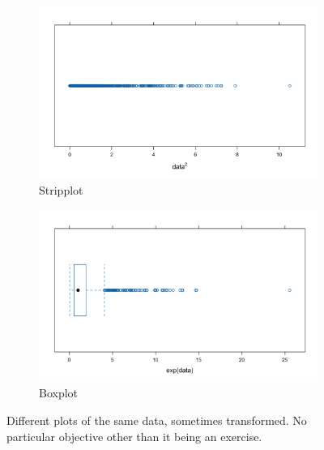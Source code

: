\documentclass[10pt, a4paper, titlepage]{article}
\begin{document}
\begin{figure}[H]
   
    \vspace{1cm}  
    \begin{subfigure}{0.4\textwidth}
        \includegraphics[width=\textwidth]{(c) Stripplot.png}
        \caption{Stripplot}
        \label{fig:stripplot}
    \end{subfigure}
    \hfill
    \begin{subfigure}{0.4\textwidth}
        \includegraphics[width=\textwidth]{(d) Boxplot.png}
        \caption{Boxplot}
        \label{fig:boxplot}
    \end{subfigure}
    
    \caption{Different plots of the same data, sometimes transformed. No particular objective other than it being an exercise.}
    \label{fig:all_plots}
\end{figure}
\end{document}
